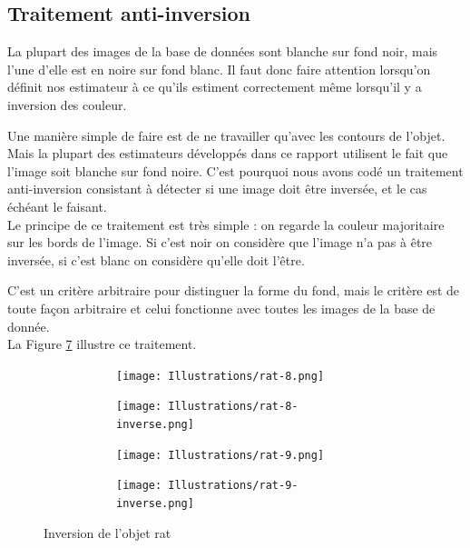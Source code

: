 \documentclass{article}
\theoremstyle{definition}
\begin{document}
   \subsection{Traitement anti-inversion}
   \label{sec:anti-inversion}
   
      La plupart des images de la base de données sont blanche sur fond noir, mais l'une d'elle est en noire sur fond blanc. Il faut donc faire attention lorsqu'on définit nos estimateur à ce qu'ils estiment correctement même lorsqu'il y a inversion des couleur.
      
      Une manière simple de faire est de ne travailler qu'avec les contours de l'objet. Mais la plupart des estimateurs développés dans ce rapport utilisent le fait que l'image soit blanche sur fond noire. C'est pourquoi nous avons codé un traitement anti-inversion consistant à détecter si une image doit être inversée, et le cas échéant le faisant. \\
      
      Le principe de ce traitement est très simple : on regarde la couleur majoritaire sur les bords de l'image. Si c'est noir on considère que l'image n'a pas à être inversée, si c'est blanc on considère qu'elle doit l'être.
      
      C'est un critère arbitraire pour distinguer la forme du fond, mais le critère est de toute façon arbitraire et celui fonctionne avec toutes les images de la base de donnée. \\
      
      La Figure \ref{anti-inversion} illustre ce traitement.
   
      \begin{figure}[!h]
	\centering
	\begin{subfigure}{.49\textwidth}
	  \begin{subfigure}{.49\textwidth}
	    \centering
	    \texttt{[image: Illustrations/rat-8.png]}
	    \label{1strat}
	  \end{subfigure}
	  \begin{subfigure}{.49\textwidth}
	    \centering
	    \texttt{[image: Illustrations/rat-8-inverse.png]}
	    \label{1strat-inverse}
	  \end{subfigure}
	\end{subfigure}
	\begin{subfigure}{.49\textwidth}
	  \begin{subfigure}{.49\textwidth}
	    \centering
	    \texttt{[image: Illustrations/rat-9.png]}
	  \label{2ndrat}
	  \end{subfigure}
	  \begin{subfigure}{.49\textwidth}
	    \centering
	    \texttt{[image: Illustrations/rat-9-inverse.png]}
	  \label{2ndrat-inverse}
	  \end{subfigure}
	\end{subfigure}
	\caption{Inversion de l'objet rat}
	\label{anti-inversion}
      \end{figure}
\end{document}
